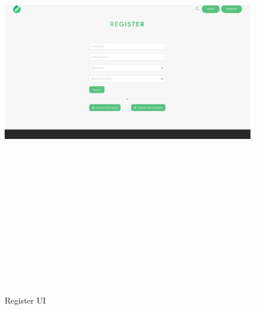 \begin{figure}[!hb]
\centering
\caption[Register UI]{Register UI}%
\label{fig:register_ui}
\includegraphics[width=\linewidth,height=20cm,keepaspectratio]{img/register_ui}
\end{figure}

